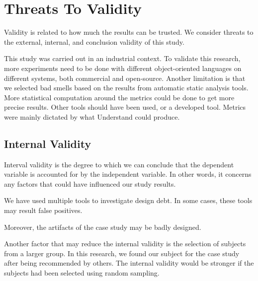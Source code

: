 







\section{Threats To Validity}
\label{sub:threats_to_validity}
Validity is related to how much the results can be trusted\cite{Wohlin:2000:ESE:330775}. We consider threats to the external, internal, and conclusion validity of this study.

This study was carried out in an industrial context. To validate this research, more experiments need to be done with different object-oriented languages on different systems, both commercial and open-source. Another limitation is that we selected bad smells based on the results from automatic static analysis tools. More statistical computation around the metrics could be done to get more precise results. Other tools should have been used, or a developed tool. Metrics were mainly dictated by what Understand could produce. 

\subsection{Internal Validity}
\label{sub:internal_validty}
Interval validity is the degree to which we can conclude that the dependent variable is accounted for by the independent variable\cite{Wohlin:2000:ESE:330775}. In other words, it concerns any factors that could have influenced our study results. 

We have used multiple tools to investigate design debt. In some cases, these tools may result false positives. 

Moreover, the artifacts of the case study may be badly designed. 

Another factor that may reduce the internal validity is the selection of subjects from a larger group\cite{Wohlin:2000:ESE:330775}. In this research, we found our subject for the case study after being recommended by others. The internal validity would be stronger if the subjects had been selected using random sampling.




